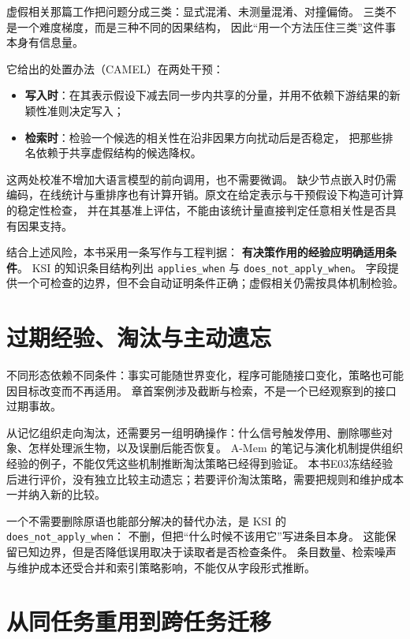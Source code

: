 虚假相关那篇工作把问题分成三类：显式混淆、未测量混淆、对撞偏倚\cite{trap-trajectory-2605}。
三类不是一个难度梯度，而是三种不同的因果结构，
因此``用一个方法压住三类''这件事本身有信息量。

它给出的处置办法（CAMEL）在两处干预\cite{trap-trajectory-2605}：
\begin{itemize}
  \item \textbf{写入时}：在其表示假设下减去同一步内共享的分量，并用不依赖下游结果的新颖性准则决定写入；
  \item \textbf{检索时}：检验一个候选的相关性在沿非因果方向扰动后是否稳定，
        把那些排名依赖于共享虚假结构的候选降权。
\end{itemize}

这两处校准不增加大语言模型的前向调用，也不需要微调\cite{trap-trajectory-2605}。
缺少节点嵌入时仍需编码，在线统计与重排序也有计算开销。原文在给定表示与干预假设下构造可计算的稳定性检查，
并在其基准上评估，不能由该统计量直接判定任意相关性是否具有因果支持。

\begin{sloppypar}
结合上述风险，本书采用一条写作与工程判据：
\textbf{有决策作用的经验应明确适用条件}。
KSI 的知识条目结构列出 \texttt{applies\_when} 与
\texttt{does\_not\_apply\_when}\cite{ksi-2607}。
字段提供一个可检查的边界，但不会自动证明条件正确；虚假相关仍需按具体机制检验。
\end{sloppypar}

\section{过期经验、淘汰与主动遗忘}
\label{sec:ch05-forget}

不同形态依赖不同条件：事实可能随世界变化，程序可能随接口变化，策略也可能因目标改变而不再适用。
章首案例涉及截断与检索，不是一个已经观察到的接口过期事故。

从记忆组织走向淘汰，还需要另一组明确操作：什么信号触发停用、删除哪些对象、怎样处理派生物，以及误删后能否恢复。
A-Mem 的笔记与演化机制提供组织经验的例子\cite{amem-2502}，不能仅凭这些机制推断淘汰策略已经得到验证。
本书E03冻结经验后进行评价，没有独立比较主动遗忘；若要评价淘汰策略，需要把规则和维护成本一并纳入新的比较。

一个不需要删除原语也能部分解决的替代办法，是 KSI 的 \texttt{does\_not\_apply\_when}：
不删，但把``什么时候不该用它''写进条目本身\cite{ksi-2607}。
这能保留已知边界，但是否降低误用取决于读取者是否检查条件。
条目数量、检索噪声与维护成本还受合并和索引策略影响，不能仅从字段形式推断。

\section{从同任务重用到跨任务迁移}
\label{sec:ch05-migrate}

